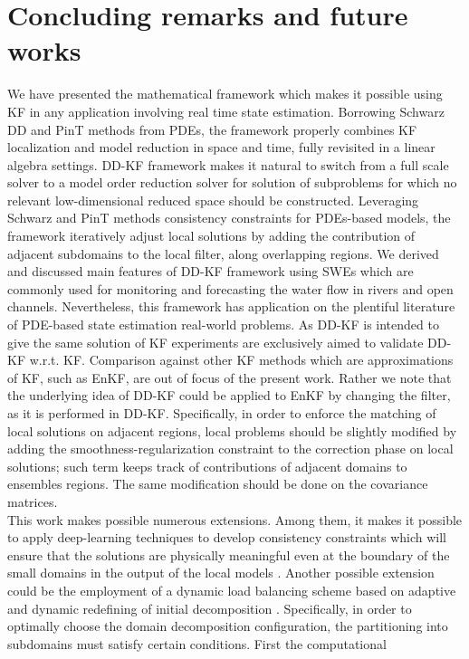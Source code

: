 \documentclass[smallcondensed]{svjour3}
\begin{document}
\section{Concluding remarks and future works}
We have presented the mathematical  framework which makes it possible  using KF  in  any application involving real time  state estimation. Borrowing Schwarz DD and PinT methods from PDEs, the framework  properly combines KF localization and model reduction in space and time, fully revisited  in a linear algebra settings. DD-KF framework makes it natural to switch from a full scale solver to a model order reduction solver for solution of subproblems for which no relevant low-dimensional reduced space should be constructed. Leveraging Schwarz and PinT  methods consistency constraints for PDEs-based models, the framework iteratively adjust local solutions by adding  the contribution of adjacent subdomains to the local filter, along  overlapping regions.
\noindent We derived and discussed main features of DD-KF framework using SWEs which are commonly used for monitoring and forecasting the water flow in rivers and open channels. Nevertheless, this framework has application on the plentiful  literature of PDE-based state estimation real-world problems. As DD-KF is intended to give the same solution of KF experiments are exclusively aimed to validate  DD-KF w.r.t. KF. Comparison against other KF methods which are approximations of KF, such as EnKF,  are out of focus of the present work.  Rather we note that the underlying idea of  DD-KF  could be applied to EnKF by changing the filter,  as it is performed in DD-KF. Specifically, in order to enforce the matching of local solutions on  adjacent  regions, local  problems should be  slightly modified by adding the smoothness-regularization constraint  to the correction phase on local solutions; such   term keeps track of contributions of adjacent domains to ensembles regions. The same modification should be done on the covariance matrices. \\
\noindent This work makes possible numerous  extensions. Among them, it makes it possible to apply
deep-learning techniques to develop consistency constraints which will ensure
that the solutions are physically meaningful even at the
boundary of the small domains in the output of the local models \cite{deeplearning4,Hahnel,deeplearning3}. Another possible extension  could be the employment of a dynamic load balancing scheme based
on  adaptive and dynamic redefining of initial decomposition \cite{arxivPPAM2019,DyDD}. Specifically, in order to optimally choose the domain decomposition configuration,  the partitioning into subdomains must satisfy certain conditions. First the computational
\end{document}
